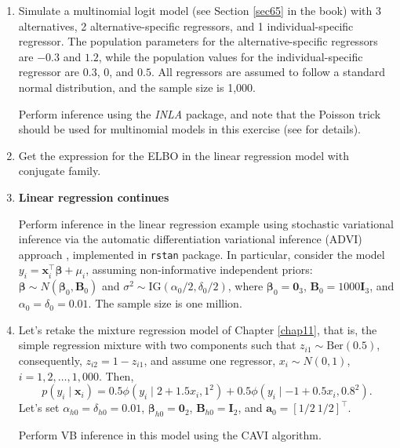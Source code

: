 \begin{enumerate}
\item Simulate a multinomial logit model (see Section \ref{sec65} in the book) with 3 alternatives, 2 alternative-specific regressors, and 1 individual-specific regressor. The population parameters for the alternative-specific regressors are $-0.3$ and $1.2$, while the population values for the individual-specific regressor are $0.3$, $0$, and $0.5$. All regressors are assumed to follow a standard normal distribution, and the sample size is 1,000. 

Perform inference using the \textit{INLA} package, and note that the Poisson trick should be used for multinomial models in this exercise (see \cite{serafini2019multinomial} for details).	
	
\item Get the expression for the ELBO in the linear regression model with conjugate family.

\item \textbf{Linear regression continues}

Perform inference in the linear regression example using stochastic variational inference via the automatic differentiation variational inference (ADVI) approach \cite{kucukelbir2017automatic}, implemented in \texttt{rstan} package. In particular, consider the model $y_i = \boldsymbol{x}_i^{\top} \boldsymbol{\beta} + \mu_i$, assuming non-informative independent priors: $\boldsymbol{\beta} \sim N(\boldsymbol{\beta}_0, \boldsymbol{B}_0)$ and $\sigma^2 \sim \mathrm{IG}(\alpha_0/2, \delta_0/2)$, where $\boldsymbol{\beta}_0 = \boldsymbol{0}_3$, $\boldsymbol{B}_0 = 1000\boldsymbol{I}_3$, and $\alpha_0 = \delta_0 = 0.01$. The sample size is one million.

\item Let's retake the mixture regression model of Chapter \ref{chap11}, that is, the simple regression mixture with two components such that $z_{i1}\sim \text{Ber}(0.5)$, consequently, $z_{i2}=1-z_{i1}$, and assume one regressor, $x_i\sim N(0,1)$, $i=1,2,\dots,1,000$. Then, 
$$p(y_i \mid \boldsymbol{x}_i) = 
0.5 \phi(y_i \mid 2+1.5x_i,1^2)+0.5 \phi(y_i \mid -1+0.5x_i,0.8^2).$$
Let's set $\alpha_{h0}=\delta_{h0}=0.01$, $\boldsymbol{\beta}_{h0}=\boldsymbol{0}_2$, $\boldsymbol{B}_{h0}=\boldsymbol{I}_2$, and $\boldsymbol{a}_0=[1/2 \ 1/2]^{\top}$.

Perform VB inference in this model using the CAVI algorithm.  
	
\end{enumerate}


